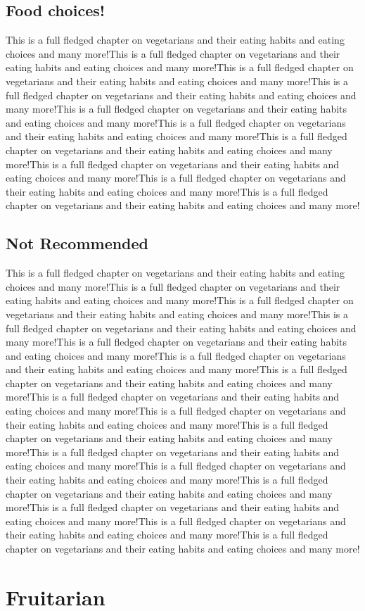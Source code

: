 \documentclass[10pt,a4paper]{report}
\begin{document}
\section{Food choices!}
This is a full fledged chapter on vegetarians and their eating habits and eating choices and many more!This is a full fledged chapter on vegetarians and their eating habits and eating choices and many more!This is a full fledged chapter on vegetarians and their eating habits and eating choices and many more!This is a full fledged chapter on vegetarians and their eating habits and eating choices and many more!This is a full fledged chapter on vegetarians and their eating habits and eating choices and many more!This is a full fledged chapter on vegetarians and their eating habits and eating choices and many more!This is a full fledged chapter on vegetarians and their eating habits and eating choices and many more!This is a full fledged chapter on vegetarians and their eating habits and eating choices and many more!This is a full fledged chapter on vegetarians and their eating habits and eating choices and many more!This is a full fledged chapter on vegetarians and their eating habits and eating choices and many more!
\section{Not Recommended}
This is a full fledged chapter on vegetarians and their eating habits and eating choices and many more!This is a full fledged chapter on vegetarians and their eating habits and eating choices and many more!This is a full fledged chapter on vegetarians and their eating habits and eating choices and many more!This is a full fledged chapter on vegetarians and their eating habits and eating choices and many more!This is a full fledged chapter on vegetarians and their eating habits and eating choices and many more!This is a full fledged chapter on vegetarians and their eating habits and eating choices and many more!This is a full fledged chapter on vegetarians and their eating habits and eating choices and many more!This is a full fledged chapter on vegetarians and their eating habits and eating choices and many more!This is a full fledged chapter on vegetarians and their eating habits and eating choices and many more!This is a full fledged chapter on vegetarians and their eating habits and eating choices and many more!This is a full fledged chapter on vegetarians and their eating habits and eating choices and many more!This is a full fledged chapter on vegetarians and their eating habits and eating choices and many more!This is a full fledged chapter on vegetarians and their eating habits and eating choices and many more!This is a full fledged chapter on vegetarians and their eating habits and eating choices and many more!This is a full fledged chapter on vegetarians and their eating habits and eating choices and many more!This is a full fledged chapter on vegetarians and their eating habits and eating choices and many more!



\chapter{Fruitarian}

\end{document}
